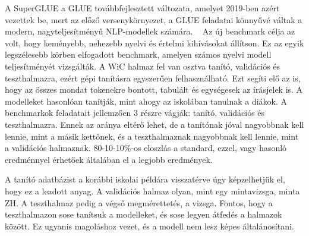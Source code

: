 \documentclass[12pt]{report}
\begin{document}
    A SuperGLUE a GLUE továbbfejlesztett változata, amelyet 2019-ben azért vezettek be, mert az előző versenykörnyezet, a GLUE feladatai könnyűvé váltak a modern, nagyteljesítményű NLP-modellek számára.
    ~\cite{wang2020superglue}
    Az új benchmark célja az volt, hogy keményebb, nehezebb nyelvi és értelmi kihívásokat állítson.
    Ez az egyik legszélesebb körben elfogadott benchmark, amelyen számos nyelvi modell teljesítményét vizsgálták.
    A WiC halmaz fel van osztva tanító, validációs és teszthalmazra, ezért gépi tanításra egyszerűen felhasználható.
    Ezt segíti elő az is, hogy az összes mondat tokenekre bontott, tabulált és egységesek az írásjelek is.
    A modelleket hasonlóan tanítják, mint ahogy az iskolában tanulnak a diákok.
    A benchmarkok feladatait jellemzően 3 részre vágják:
    tanító, validációs és teszthalmazra.
    Ennek az aránya eltérő lehet, de a tanítónak jóval nagyobbnak kell lennie, mint a másik kettőnek, és a teszthalmaznak nagyobbnak kell lennie, mint a validációs halmaznak.
    80-10-10\%-os eloszlás a standard, ezzel, vagy hasonló eredménnyel érhetőek általában el a legjobb eredmények.

    A tanító adatbázist a korábbi iskolai példára visszatérve úgy képzelhetjük el, hogy ez a leadott anyag.
    A validációs halmaz olyan, mint egy mintavizsga, minta ZH. A teszthalmaz pedig a végső megmérettetés, a vizsga.
    Fontos, hogy a teszthalmazon sose tanítsuk a modelleket, és sose legyen átfedés a halmazok között.
    Ez ugyanis magoláshoz vezet, és a modell nem lesz képes általánosítani.
\end{document}
